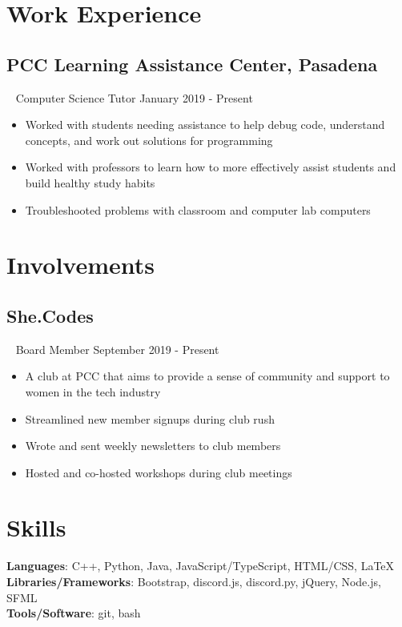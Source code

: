 \documentclass{article}
\newcommand{\resumesection}[3]{
    \subsection*{#1}
    \ 
    \footnotesize
    \textcolor{wordgrey}{#2}
    \normalsize
    \hfill
    \textcolor{wordgrey}{#3}
}
\begin{document}
\section*{Work Experience}
\resumesection{PCC Learning Assistance Center, Pasadena}{Computer Science Tutor}{January 2019 - Present}
\begin{itemize}
    \item Worked with students needing assistance to help debug code, understand concepts, and work out solutions for programming 
    \item Worked with professors to learn how to more effectively assist students and build healthy study habits
    \item Troubleshooted problems with classroom and computer lab computers
\end{itemize}

\section*{Involvements}
\resumesection{She.Codes}{Board Member}{September 2019 - Present}
\begin{itemize}
    \item A club at PCC that aims to provide a sense of community and support to women in the tech industry
    \item Streamlined new member signups during club rush
    \item Wrote and sent weekly newsletters to club members
    \item Hosted and co-hosted workshops during club meetings
\end{itemize}

\section*{Skills}
\textbf{Languages}: C++, Python, Java, JavaScript/TypeScript, HTML/CSS, {\selectfont\LaTeX}\\
\textbf{Libraries/Frameworks}: Bootstrap, discord.js, discord.py, jQuery, Node.js, SFML\\
\textbf{Tools/Software}: git, bash
\end{document}
